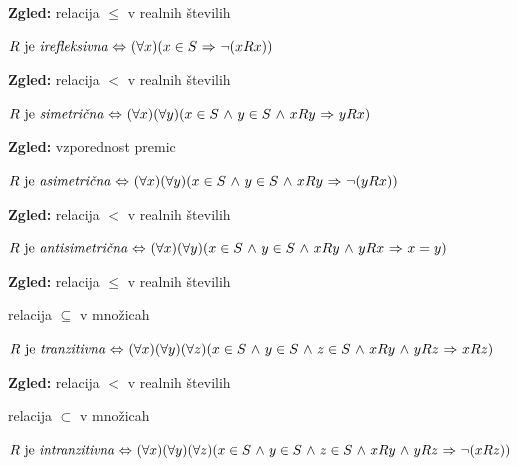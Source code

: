 \documentclass[11pt,paper=b5,footinclude,headinclude]{scrbook} %
\def\inn {{~\wedge~}}
\def\sledi {{~\Rightarrow~}}
\def\cee {{~\Leftrightarrow~}}
\begin{document}
\textbf{ Zgled:} relacija $\le$ v realnih številih

\bigskip

$R \textrm{ je {\em irefleksivna}} \cee (\forall x)(x\in S\sledi \neg(xRx))$


\textbf{ Zgled:} relacija $<$ v realnih številih

\bigskip

$R \textrm{ je {\em simetrična}} \cee (\forall x)(\forall y)(x\in S\inn y\in S\inn xRy\sledi yRx)$

%
\textbf{ Zgled:} vzporednost premic


\bigskip

$R \textrm{ je {\em asimetrična}} \cee (\forall x)(\forall y)(x\in S\inn y\in S\inn xRy\sledi \neg(yRx))$


\textbf{ Zgled:} relacija $<$ v realnih številih


\bigskip
$R \textrm{ je {\em antisimetrična}} \cee (\forall x)(\forall y)(x\in S\inn y\in S\inn xRy\inn yRx\sledi x = y)$

\textbf{ Zgled:}
relacija $\le$ v realnih številih

relacija $\subseteq$ v množicah

\bigskip

$R \textrm{ je {\em tranzitivna}} \cee (\forall x)(\forall y)(\forall z)(x\in S\inn y\in S\inn z\in S\inn xRy\inn yRz\sledi xRz)$


\textbf{ Zgled:} relacija $<$ v realnih številih

relacija $\subset$ v množicah

\bigskip

$R \textrm{ je {\em intranzitivna}} \cee (\forall x)(\forall y)(\forall z)(x\in S\inn y\in S\inn z\in S\inn xRy\inn yRz\sledi \neg(xRz))$
\end{document}
